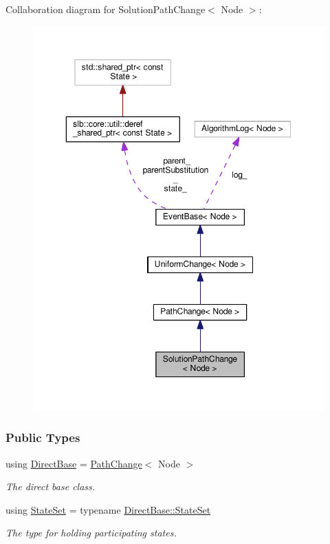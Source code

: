 Collaboration diagram for Solution\+Path\+Change$<$ Node $>$\+:\nopagebreak
\begin{figure}[H]
\begin{center}
\leavevmode
\includegraphics[width=350pt]{structSolutionPathChange__coll__graph}
\end{center}
\end{figure}
\subsubsection*{Public Types}
\begin{DoxyCompactItemize}
\item 
using \hyperlink{structSolutionPathChange_ae33e0af33ce7ab2be686078e05d74b88}{Direct\+Base} = \hyperlink{structPathChange}{Path\+Change}$<$ Node $>$\hypertarget{structSolutionPathChange_ae33e0af33ce7ab2be686078e05d74b88}{}\label{structSolutionPathChange_ae33e0af33ce7ab2be686078e05d74b88}

\begin{DoxyCompactList}\small\item\em The direct base class. \end{DoxyCompactList}\item 
using \hyperlink{structSolutionPathChange_ac2616466667e28ff0aa3ff711f4758f9}{State\+Set} = typename \hyperlink{structUniformChange_afc89af5d5e897d7664eb9ae7770d145c}{Direct\+Base\+::\+State\+Set}\hypertarget{structSolutionPathChange_ac2616466667e28ff0aa3ff711f4758f9}{}\label{structSolutionPathChange_ac2616466667e28ff0aa3ff711f4758f9}

\begin{DoxyCompactList}\small\item\em The type for holding participating states. \end{DoxyCompactList}\end{DoxyCompactItemize}
